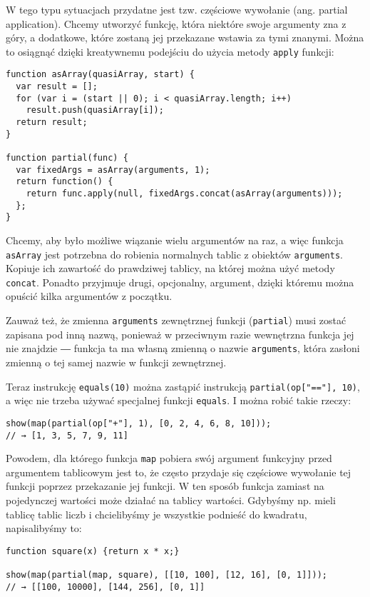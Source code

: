   
W tego typu sytuacjach przydatne jest tzw. częściowe wywołanie (ang. partial application). Chcemy utworzyć funkcję, która niektóre swoje argumenty zna z góry, a dodatkowe, które zostaną jej przekazane wstawia za tymi znanymi. Można to osiągnąć dzięki kreatywnemu podejściu do użycia metody \texttt{apply} funkcji:

  
\begin{verbatim} 
function asArray(quasiArray, start) {
  var result = [];
  for (var i = (start || 0); i < quasiArray.length; i++)
    result.push(quasiArray[i]);
  return result;
}

function partial(func) {
  var fixedArgs = asArray(arguments, 1);
  return function() {
    return func.apply(null, fixedArgs.concat(asArray(arguments)));
  };
}
 \end{verbatim}
  
Chcemy, aby było możliwe wiązanie wielu argumentów na raz, a więc funkcja \texttt{asArray} jest potrzebna do robienia normalnych tablic z obiektów \texttt{arguments}. Kopiuje ich zawartość do prawdziwej tablicy, na której można użyć metody \texttt{concat}. Ponadto przyjmuje drugi, opcjonalny, argument, dzięki któremu można opuścić kilka argumentów z początku.

  
Zauważ też, że zmienna \texttt{arguments} zewnętrznej funkcji (\texttt{partial}) musi zostać zapisana pod inną nazwą, ponieważ w przeciwnym razie wewnętrzna funkcja jej nie znajdzie ― funkcja ta ma własną zmienną o nazwie \texttt{arguments}, która zasłoni zmienną o tej samej nazwie w funkcji zewnętrznej.

  
Teraz instrukcję \texttt{equals(10)} można zastąpić instrukcją \texttt{partial(op["=="], 10)}, a więc nie trzeba używać specjalnej funkcji \texttt{equals}. I można robić takie rzeczy:

  
\begin{verbatim} 
show(map(partial(op["+"], 1), [0, 2, 4, 6, 8, 10]));
// → [1, 3, 5, 7, 9, 11]
\end{verbatim}
  
Powodem, dla którego funkcja \texttt{map} pobiera swój argument funkcyjny przed argumentem tablicowym jest to, że często przydaje się częściowe wywołanie tej funkcji poprzez przekazanie jej funkcji. W ten sposób funkcja zamiast na pojedynczej wartości może działać na tablicy wartości. Gdybyśmy np. mieli tablicę tablic liczb i chcielibyśmy je wszystkie podnieść do kwadratu, napisalibyśmy to:

  
\begin{verbatim} 
function square(x) {return x * x;}

show(map(partial(map, square), [[10, 100], [12, 16], [0, 1]]));
// → [[100, 10000], [144, 256], [0, 1]]
\end{verbatim}


